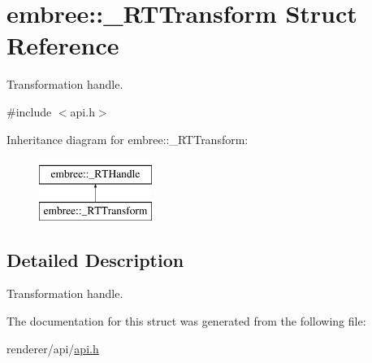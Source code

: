 \hypertarget{structembree_1_1___r_t_transform}{
\section{embree::\_\-RTTransform Struct Reference}
\label{structembree_1_1___r_t_transform}
}


Transformation handle.  




{\ttfamily \#include $<$api.h$>$}

Inheritance diagram for embree::\_\-RTTransform:\begin{figure}[H]
\begin{center}
\leavevmode
\includegraphics[height=2.000000cm]{structembree_1_1___r_t_transform}
\end{center}
\end{figure}


\subsection{Detailed Description}
Transformation handle. 

The documentation for this struct was generated from the following file:\begin{DoxyCompactItemize}
\item 
renderer/api/\hyperlink{api_8h}{api.h}\end{DoxyCompactItemize}
